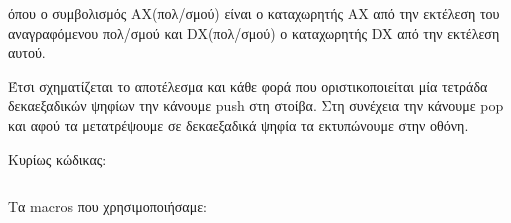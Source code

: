\documentclass[a4paper,10pt]{article} \usepackage{anysize}
\begin{document}
\noindent όπου ο συμβολισμός ΑΧ(πολ/σμού) είναι ο καταχωρητής AX από την εκτέλεση του
αναγραφόμενου πολ/σμού 
και DX(πολ/σμού) ο καταχωρητής DX από την εκτέλεση αυτού.

Έτσι σχηματίζεται το αποτέλεσμα και κάθε φορά που οριστικοποιείται μία τετράδα
δεκαεξαδικών ψηφίων την κάνουμε push στη στοίβα. Στη συνέχεια την κάνουμε pop
και αφού τα μετατρέψουμε σε δεκαεξαδικά ψηφία τα εκτυπώνουμε στην οθόνη.

\noindent Κυρίως κώδικας:
\inputminted[linenos,obeytabs,fontsize=\footnotesize]{nasm}{files/4.asm}
Τα macros που χρησιμοποιήσαμε:
\inputminted[linenos,obeytabs,fontsize=\footnotesize]{nasm}{files/4.txt}
\end{document}
